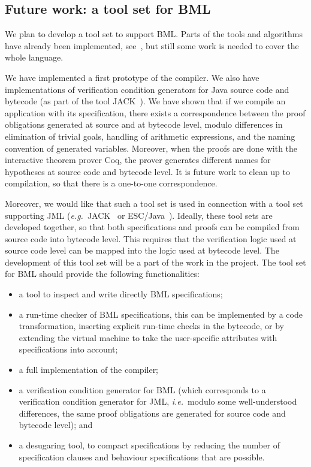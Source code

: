 \subsection{Future work: a tool set for BML}\label{SecTools}

We plan to develop a tool set to support BML. Parts of the tools and
algorithms have already been implemented, see~\cite{BurdyP06}, but
still some work is needed to cover the whole language. 

We have implemented a first prototype of the \JMLtoBML compiler. We
also have implementations of verification condition generators for
Java source code and bytecode (as part of the tool
JACK~\cite{BurdyRL03}). We have shown that if we compile an
application with its specification, there exists a correspondence
between the proof obligations generated at source and at bytecode
level, modulo differences in elimination of trivial goals, handling of
arithmetic expressions, and the naming convention of generated
variables. Moreover, when the proofs are done with the interactive
theorem prover Coq, the prover generates different names for
hypotheses at source code and bytecode level. It is future work to
clean up to compilation, so that there is a one-to-one correspondence.


Moreover, we would like that such a tool set is used in connection
with a tool set supporting JML (\emph{e.g.}\ JACK~\cite{BurdyRL03} or
ESC/Java~\cite{CokK04}). Ideally, these tool sets are developed
together, so that both specifications and proofs can be compiled from
source code into bytecode level. This requires that the verification
logic used at source code level can be mapped into the logic used at
bytecode level. The development of this tool set will be a part of the
work in the \mobius project. The tool set for BML should provide the
following functionalities:

\begin{itemize}
\item a tool to inspect and write directly BML specifications;
\item a run-time checker of BML specifications, this can be
implemented by a code transformation, inserting explicit run-time
checks in the bytecode, or by extending the virtual machine to take
the user-specific attributes with specifications into account;
\item a full implementation of the \JMLtoBML compiler;
\item a verification condition generator for BML (which
corresponds to a verification condition generator for JML,
\emph{i.e.}\ modulo some well-understood differences, the same proof
obligations are generated for source code and bytecode level);  and
\item a desugaring tool, to compact specifications by reducing the
number of specification clauses and behaviour specifications that are
possible. 
\end{itemize}

